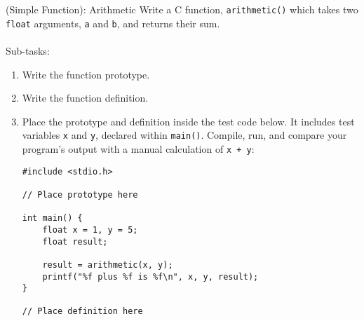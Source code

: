 \documentclass{lab}
\begin{document}
\begin{task}{(Simple Function): Arithmetic}{}
Write a C function, \texttt{arithmetic()} which takes two \texttt{float} arguments, \texttt{a} and \texttt{b}, and returns their sum.
\\~\\
Sub-tasks:
\begin{enumerate}
	\item Write the function prototype.
	\item Write the function definition.
	\item Place the prototype and definition inside the test code below. It includes test variables \texttt{x} and \texttt{y}, declared within \texttt{main()}. Compile, run, and compare your program's output with a manual calculation of \texttt{x + y}:
	\begin{lstlisting}[style=CStyle]
#include <stdio.h>
	
// Place prototype here
	
int main() {
	float x = 1, y = 5;
	float result;
	
	result = arithmetic(x, y);
	printf("%f plus %f is %f\n", x, y, result);
}

// Place definition here
	\end{lstlisting}
\end{enumerate}
\end{task}
\end{document}
